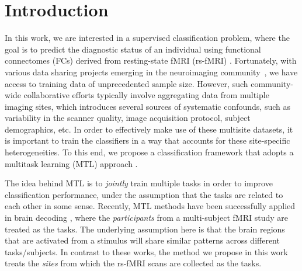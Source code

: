 \section{Introduction}
In this work, we are interested in a supervised classification problem, where the goal is to predict the diagnostic status of an individual using functional connectomes (FCs) derived from resting-state fMRI (rs-fMRI) \cite{Castellanos:2013}. 
Fortunately, with various data sharing projects emerging in the neuroimaging community~\cite{Poline:2012,ADHD200}, we have access to training data of unprecedented sample size.
However, such community-wide collaborative efforts typically involve aggregating data from multiple imaging sites, which introduces several sources of systematic confounds, such as variability in the scanner quality, image acquisition protocol, subject demographics, etc.
In order to effectively make use of these multisite datasets, it is important to train the classifiers in a way that accounts for these site-specific heterogeneities. 
To this end, we propose a classification framework that adopts a multitask learning (MTL) approach \cite{Obozinski:2010,Chen:2012b, Rao:2013,Marquand:2014}.

The idea behind MTL is to \emph{jointly} train multiple tasks in order to improve classification performance, under the assumption that the tasks are related to each other in some sense.
Recently, MTL methods have been successfully applied in brain decoding \cite{Rao:2013,Marquand:2014}, where the \emph{participants} from a multi-subject fMRI study are treated as the tasks.
The underlying assumption here is that the brain regions that are activated from a stimulus will share similar patterns across different tasks/subjects.
In contrast to these works, the method we propose in this work treats the \emph{sites} from which the rs-fMRI scans are collected as the tasks.
